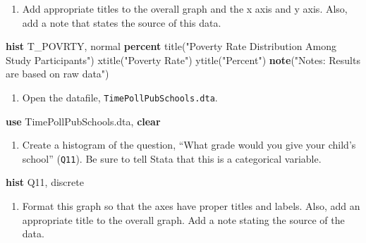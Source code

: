 \documentclass[
]{book}
\newenvironment{Shaded}{\begin{snugshade}}{\end{snugshade}}
\newcommand{\BaseNTok}[1]{\textcolor[rgb]{0.00,0.00,0.81}{#1}}
\newcommand{\FunctionTok}[1]{\textcolor[rgb]{0.00,0.00,0.00}{#1}}
\newcommand{\KeywordTok}[1]{\textcolor[rgb]{0.13,0.29,0.53}{\textbf{#1}}}
\newcommand{\NormalTok}[1]{#1}
\newcommand{\StringTok}[1]{\textcolor[rgb]{0.31,0.60,0.02}{#1}}
\providecommand{\tightlist}{%
  \setlength{\itemsep}{0pt}\setlength{\parskip}{0pt}}
\begin{document}
\begin{alert}
\begin{enumerate}
\def\labelenumi{\arabic{enumi}.}
\setcounter{enumi}{4}
\tightlist
\item
  Add appropriate titles to the overall graph and the x axis and y axis. Also, add a note that states the source of this data.
\end{enumerate}

\begin{Shaded}
\begin{Highlighting}[]
\KeywordTok{hist}\NormalTok{ T\_POVRTY, }\FunctionTok{normal} \KeywordTok{percent} \BaseNTok{title}\NormalTok{(}\StringTok{"Poverty Rate Distribution Among Study Participants"}\NormalTok{) }\BaseNTok{xtitle}\NormalTok{(}\StringTok{"Poverty Rate"}\NormalTok{) }\BaseNTok{ytitle}\NormalTok{(}\StringTok{"Percent"}\NormalTok{) }\KeywordTok{note}\NormalTok{(}\StringTok{"Notes: Results are based on raw data"}\NormalTok{)}
\end{Highlighting}
\end{Shaded}

\begin{enumerate}
\def\labelenumi{\arabic{enumi}.}
\setcounter{enumi}{5}
\tightlist
\item
  Open the datafile, \texttt{TimePollPubSchools.dta}.
\end{enumerate}

\begin{Shaded}
\begin{Highlighting}[]
\KeywordTok{use}\NormalTok{ TimePollPubSchools.dta, }\KeywordTok{clear}
\end{Highlighting}
\end{Shaded}

\begin{enumerate}
\def\labelenumi{\arabic{enumi}.}
\setcounter{enumi}{6}
\tightlist
\item
  Create a histogram of the question, ``What grade would you give your child's school'' (\texttt{Q11}). Be sure to tell Stata that this is a categorical variable.
\end{enumerate}

\begin{Shaded}
\begin{Highlighting}[]
\KeywordTok{hist}\NormalTok{ Q11, discrete}
\end{Highlighting}
\end{Shaded}

\begin{enumerate}
\def\labelenumi{\arabic{enumi}.}
\setcounter{enumi}{7}
\tightlist
\item
  Format this graph so that the axes have proper titles and labels. Also, add an appropriate title to the overall graph. Add a note stating the source of the data.
\end{enumerate}


\end{alert}
\end{document}
